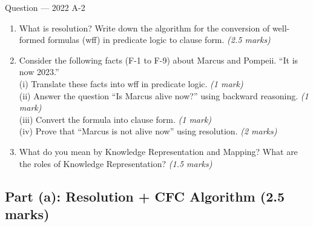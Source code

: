 \documentclass[12pt,a4paper]{article}
\begin{document}
\begin{qbox}{Question --- 2022 A-2}
\begin{enumerate}[label=(\alph*),noitemsep]
  \item What is resolution? Write down the algorithm for the conversion of well-formed formulas (wff) in predicate logic to clause form. \hfill\textit{(2.5 marks)}
  \item Consider the following facts (F-1 to F-9) about Marcus and Pompeii. ``It is now 2023.''\\
    (i) Translate these facts into wff in predicate logic. \hfill\textit{(1 mark)}\\
    (ii) Answer the question ``Is Marcus alive now?'' using backward reasoning. \hfill\textit{(1 mark)}\\
    (iii) Convert the formula into clause form. \hfill\textit{(1 mark)}\\
    (iv) Prove that ``Marcus is not alive now'' using resolution. \hfill\textit{(2 marks)}
  \item What do you mean by Knowledge Representation and Mapping? What are the roles of Knowledge Representation? \hfill\textit{(1.5 marks)}
\end{enumerate}
\end{qbox}

\subsection{Part (a): Resolution + CFC Algorithm (2.5 marks)}
\end{document}
